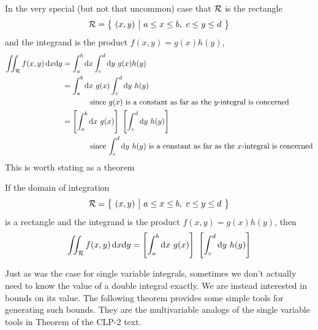 In the very special (but not that uncommon) case that $\mathcal{R}$ is the 
rectangle 
\begin{equation*}
\mathcal{R}=\big\{ \ (x,y)\ \big|\ a\le x\le b,\ c\le y\le d\ \big\}
\end{equation*} 
and the integrand is the product $f(x,y)=g(x)h(y)$,
\begin{align*}
\dblInt_\cR f(x,y)\,\dee{x}\dee{y}
&=\int_a^b\dee{x} \int_c^d\dee{y}\ g(x) h(y) \\
&=\int_a^b\dee{x}\ g(x) \int_c^d\dee{y}\  h(y) \\
&\hskip0.5in\text{since $g(x)$ is a constant as far as the $y$-integral is concerned} \\
&=\left[ \int_a^b\dee{x}\ g(x)\right]\ \left[\int_c^d\dee{y}\  h(y)\right] \\
&\hskip0.5in\text{since $\int_c^d\dee{y}\  h(y)$ is a constant as far 
as the $x$-integral is concerned}
\end{align*}
This is worth stating as a theorem

\begin{theorem}\label{thm factorize}
If the domain of integration
\begin{equation*}
\mathcal{R}=\big\{ \ (x,y)\ \big|\ a\le x\le b,\ c\le y\le d\ \big\}
\end{equation*} 
is a rectangle and the integrand is the product $f(x,y)=g(x)h(y)$, then
\begin{equation*}
\dblInt_\cR f(x,y)\,\dee{x}\dee{y}
=\left[ \int_a^b\dee{x}\ g(x)\right]\ \left[\int_c^d\dee{y}\  h(y)\right] 
\end{equation*}
\end{theorem}

Just as was the case for single variable integrals, sometimes we don't
actually need to know the value of a double integral exactly. We are
instead interested in bounds on its value. 
The following theorem provides some simple tools for generating such bounds.
They are the multivariable analogs of the single variable tools in
Theorem  of the CLP-2 text.  


